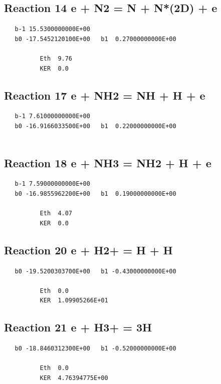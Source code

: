 \documentclass[12pt]{article}
\begin{document}
\subsection{
Reaction 14 e + N2 = N + N*(2D) + e }
\begin{small}\begin{verbatim}
   b-1 15.5300000000E+00
   b0 -17.5452120100E+00   b1  0.27000000000E+00

          Eth  9.76
          KER  0.0

\end{verbatim}\end{small}
\newpage

\subsection{
Reaction 17 e + NH2 = NH + H + e }
\begin{small}\begin{verbatim}
   b-1 7.61000000000E+00
   b0 -16.9166033500E+00   b1  0.22000000000E+00


\end{verbatim}\end{small}
\newpage

\subsection{
Reaction 18 e + NH3 = NH2 + H + e }
\begin{small}\begin{verbatim}
   b-1 7.59000000000E+00
   b0 -16.9855962200E+00   b1  0.19000000000E+00

          Eth  4.07
          KER  0.0

\end{verbatim}\end{small}
\newpage

\subsection{
Reaction 20 e + H2+ = H + H }
\begin{small}\begin{verbatim}
   b0 -19.5200303700E+00   b1 -0.43000000000E+00

          Eth  0.0
          KER  1.09905266E+01

\end{verbatim}\end{small}
\newpage

\subsection{
Reaction 21 e + H3+ = 3H }
\begin{small}\begin{verbatim}
   b0 -18.8460312300E+00   b1 -0.52000000000E+00

          Eth  0.0
          KER  4.76394775E+00

\end{verbatim}\end{small}
\newpage
\end{document}
